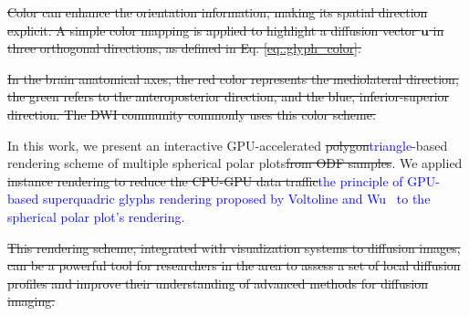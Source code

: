 \documentclass[twoside,twocolumn,10pt]{article}
\begin{document}
\sout{Color can enhance the orientation information, making its spatial direction explicit. A simple color mapping is applied to highlight a diffusion vector $\bm{u}$ in three orthogonal directions, as defined in Eq. \ref{eq::glyph_color}.}


\sout{In the brain anatomical axes, the red color represents the mediolateral direction, the green refers to the anteroposterior direction, and the blue, inferior-superior direction. The DWI community commonly uses this color scheme.}


In this work, we present an interactive GPU-accelerated \sout{polygon}\textcolor{blue}{triangle}-based rendering scheme of multiple spherical polar plots\sout{from ODF samples}. We applied \sout{instance rendering to reduce the CPU-GPU data traffic}\textcolor{blue}{the principle of GPU-based superquadric glyphs rendering proposed by Voltoline and Wu~\cite{voltoline2021} to the spherical polar plot's rendering}.



\sout{This rendering scheme, integrated with visualization systems to diffusion images, can be a powerful tool for researchers in the area to assess a set of local diffusion profiles and improve their understanding of advanced methods for diffusion imaging.}
\end{document}
